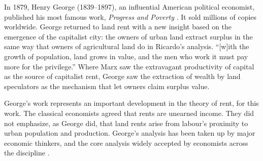 In 1879, Henry George (1839--1897), an influential American political economist, published his most famous work, \textit{Progress and Poverty} \cite{georgeProgressPovertyInquiry1973}. It sold millions of copies worldwide. George returned to land rent with a new insight based on the emergence of the capitalist city: the owners of urban land extract surplus in the same way that owners of agricultural land do in Ricardo's analysis. ``[w]ith the growth of population, land grows in value, and the men who work it must pay more for the privilege.''  Where Marx saw the extravagant productivity of capital as the source of capitalist rent, George saw the extraction of wealth by land speculators as the mechanism that let owners claim surplus value. %

George's work represents an important development in the theory of rent, for this work. The classical economists agreed that rents are unearned income. They did not emphasize, as George did, that land rents arise from labour's proximity to urban population and production.%
George's analysis has been taken up by major economic thinkers, and the core analysis widely accepted by economists across the discipline \cite{GET_george_support}. 

